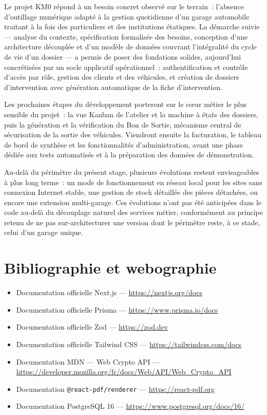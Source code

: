 \documentclass[11pt,a4paper]{report}
\begin{document}
Le projet KM0 répond à un besoin concret observé sur le terrain~: l'absence d'outillage
numérique adapté à la gestion quotidienne d'un garage automobile traitant à la fois des
particuliers et des institutions étatiques. La démarche suivie --- analyse du contexte,
spécification formalisée des besoins, conception d'une architecture découplée et d'un
modèle de données couvrant l'intégralité du cycle de vie d'un dossier --- a permis de
poser des fondations solides, aujourd'hui concrétisées par un socle applicatif
opérationnel~: authentification et contrôle d'accès par rôle, gestion des clients et des
véhicules, et création de dossiers d'intervention avec génération automatique de la fiche
d'intervention.

Les prochaines étapes du développement porteront sur le cœur métier le plus sensible du
projet~: la vue Kanban de l'atelier et la machine à états des dossiers, puis la
génération et la vérification du Bon de Sortie, mécanisme central de sécurisation de la
sortie des véhicules. Viendront ensuite la facturation, le tableau de bord de synthèse et
les fonctionnalités d'administration, avant une phase dédiée aux tests automatisés et à la
préparation des données de démonstration.

Au-delà du périmètre du présent stage, plusieurs évolutions restent envisageables à plus
long terme~: un mode de fonctionnement en réseau local pour les sites sans connexion
Internet stable, une gestion de stock détaillée des pièces détachées, ou encore une
extension multi-garage. Ces évolutions n'ont pas été anticipées dans le code au-delà du
découplage naturel des services métier, conformément au principe retenu de ne pas
sur-architecturer une version dont le périmètre reste, à ce stade, celui d'un garage
unique.

\chapter*{Bibliographie et webographie}

\begin{itemize}[leftmargin=1cm]
\item Documentation officielle Next.js --- \url{https://nextjs.org/docs}
\item Documentation officielle Prisma --- \url{https://www.prisma.io/docs}
\item Documentation officielle Zod --- \url{https://zod.dev}
\item Documentation officielle Tailwind CSS --- \url{https://tailwindcss.com/docs}
\item Documentation MDN --- Web Crypto API --- \url{https://developer.mozilla.org/fr/docs/Web/API/Web_Crypto_API}
\item Documentation \texttt{@react-pdf/renderer} --- \url{https://react-pdf.org}
\item Documentation PostgreSQL 16 --- \url{https://www.postgresql.org/docs/16/}
\end{itemize}
\end{document}
